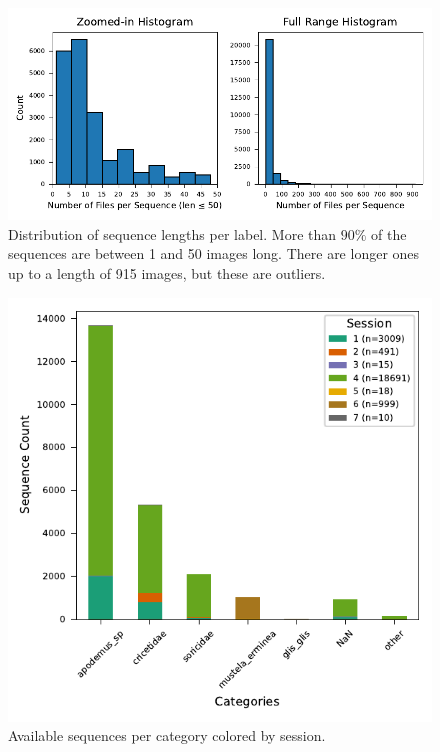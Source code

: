     

    \begin{figure}[ht]
    \centering
    \includegraphics{figures/seq_len_histograms.pdf}
    \caption{Distribution of sequence lengths per label. More than \(90\%\) of the sequences are between 1 and 50 images long. There are longer ones up to a length of 915 images, but these are outliers.}
    \label{fig:seq_len_histograms}
    \end{figure}

    \begin{figure}[ht]
    \centering
    \includegraphics{figures/label2_session.pdf}
    \caption{Available sequences per category colored by session.}
    \label{fig:sequenceperlabel}
    \end{figure}

